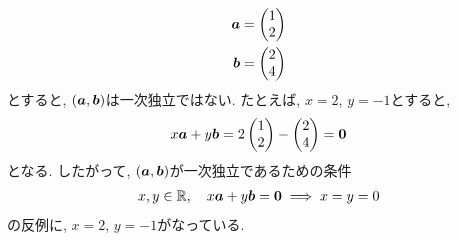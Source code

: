 \begin{example}
  \label{ex:nonlinindep}
  \begin{align*}
  \boldsymbol{a}&=\begin{pmatrix}1\\2\end{pmatrix}\\
  \boldsymbol{b}&=\begin{pmatrix}2\\4\end{pmatrix}
  \end{align*}
  とすると,
  $(\boldsymbol{a},\boldsymbol{b})$は一次独立ではない.
  たとえば, $x=2$, $y=-1$とすると,
  \begin{align*}
    x\boldsymbol{a}+y\boldsymbol{b}=
    2\begin{pmatrix}1\\2\end{pmatrix}-\begin{pmatrix}2\\4\end{pmatrix}=
    \boldsymbol{0}
  \end{align*}
  となる.
  したがって,
  $(\boldsymbol{a},\boldsymbol{b})$が一次独立であるための条件
  \begin{align*}
    x,y\in\mathbb{R},\quad
    x\boldsymbol{a}+y\boldsymbol{b}=\boldsymbol{0}
    \implies x=y=0
  \end{align*}
  の反例に,  $x=2$, $y=-1$がなっている.
\end{example}





